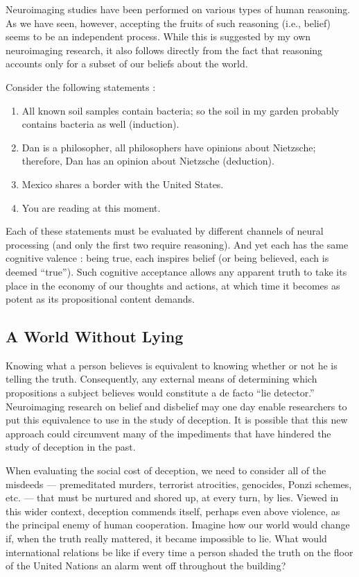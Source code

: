 \documentclass[a4paper,14pt]{extbook}
\begin{document}
Neuroimaging studies have been performed on various types of human reasoning.
As we have seen, however, accepting the fruits of such reasoning (i.e., belief) seems to be an independent process.
While this is suggested by my own neuroimaging research, it also follows directly from the fact that reasoning accounts only for a subset of our beliefs about the world.

Consider the following statements :

\begin{enumerate}
      \item
            All known soil samples contain bacteria; so the soil in my garden probably contains bacteria as well (induction).
      \item
            Dan is a philosopher, all philosophers have opinions about Nietzsche;
            therefore, Dan has an opinion about Nietzsche (deduction).
      \item
            Mexico shares a border with the United States.
      \item
            You are reading at this moment.

\end{enumerate}

Each of these statements must be evaluated by different channels of neural processing (and only the first two require reasoning).
And yet each has the same cognitive valence :
being true, each inspires belief (or being believed, each is deemed ``true'').
Such cognitive acceptance allows any apparent truth to take its place in the economy of our thoughts and actions, at which time it becomes as potent as its propositional content demands.

\subsection{A World Without Lying}

Knowing what a person believes is equivalent to knowing whether or not he is telling the truth.
Consequently, any external means of determining which propositions a subject believes would constitute a de facto ``lie detector.''
Neuroimaging research on belief and disbelief may one day enable researchers to put this equivalence to use in the study of deception.
It is possible that this new approach could circumvent many of the impediments that have hindered the study of deception in the past.

When evaluating the social cost of deception, we need to consider all of the misdeeds --- premeditated murders, terrorist atrocities, genocides, Ponzi schemes, etc. --- that must be nurtured and shored up, at every turn, by lies.
Viewed in this wider context, deception commends itself, perhaps even above violence, as the principal enemy of human cooperation.
Imagine how our world would change if, when the truth really mattered, it became impossible to lie.
What would international relations be like if every time a person shaded the truth on the floor of the United Nations an alarm went off throughout the building?
\end{document}
